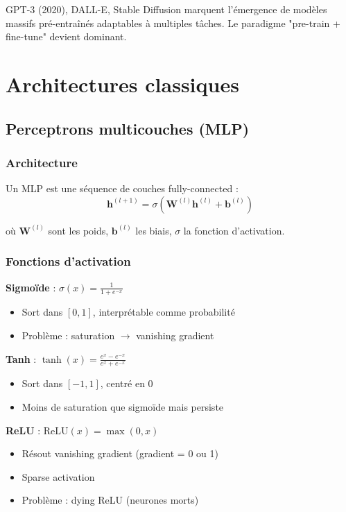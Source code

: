 GPT-3 (2020), DALL-E, Stable Diffusion marquent l'émergence de modèles massifs pré-entraînés adaptables à multiples tâches. Le paradigme "pre-train + fine-tune" devient dominant.

\section{Architectures classiques}

\subsection{Perceptrons multicouches (MLP)}

\subsubsection{Architecture}

Un MLP est une séquence de couches fully-connected :
\[
\mathbf{h}^{(l+1)} = \sigma\left(\mathbf{W}^{(l)}\mathbf{h}^{(l)} + \mathbf{b}^{(l)}\right)
\]

où $\mathbf{W}^{(l)}$ sont les poids, $\mathbf{b}^{(l)}$ les biais, $\sigma$ la fonction d'activation.

\subsubsection{Fonctions d'activation}

\textbf{Sigmoïde} : $\sigma(x) = \frac{1}{1 + e^{-x}}$
\begin{itemize}
    \item Sort dans $[0, 1]$, interprétable comme probabilité
    \item Problème : saturation $\rightarrow$ vanishing gradient
\end{itemize}

\textbf{Tanh} : $\tanh(x) = \frac{e^x - e^{-x}}{e^x + e^{-x}}$
\begin{itemize}
    \item Sort dans $[-1, 1]$, centré en 0
    \item Moins de saturation que sigmoïde mais persiste
\end{itemize}

\textbf{ReLU} : $\text{ReLU}(x) = \max(0, x)$
\begin{itemize}
    \item Résout vanishing gradient (gradient = 0 ou 1)
    \item Sparse activation
    \item Problème : dying ReLU (neurones morts)
\end{itemize}

